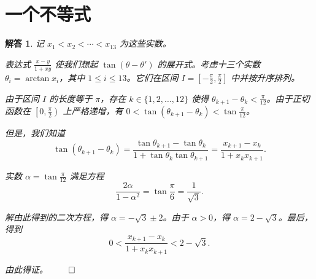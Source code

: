 \documentclass[12pt,UTF8]{ctexbook}
\theoremstyle{exercisestyle}
\theoremstyle{solutionstyle}
\newtheorem*{solution*}{解答}
\newenvironment{solution}
  {\begin{solution*}}
  {\hfill\ensuremath{\qed}\end{solution*}}
\begin{document}
\section{一个不等式}
\begin{solution}
  记 \(x_1 < x_2 < \cdots < x_{13}\) 为这些实数。

  表达式 \(\frac{x-y}{1+xy}\) 使我们想起 \(\tan(\theta - \theta')\) 的展开式。考虑十三个实数 \(\theta_i = \arctan x_i\)，其中 \(1 \leq i \leq 13\)。它们在区间 \(I = \left[-\frac{\pi}{2}, \frac{\pi}{2}\right]\) 中并按升序排列。

  由于区间 \(I\) 的长度等于 \(\pi\)，存在 \(k \in \{1, 2, \dots, 12\}\) 使得 \(\theta_{k+1} - \theta_k < \frac{\pi}{12}\)。由于正切函数在 \(\left[0, \frac{\pi}{2}\right)\) 上严格递增，有 \(0 < \tan(\theta_{k+1} - \theta_k) < \tan \frac{\pi}{12}\)。

  但是，我们知道
  \[
  \tan(\theta_{k+1} - \theta_k) = \frac{\tan \theta_{k+1} - \tan \theta_k}{1 + \tan \theta_k \tan \theta_{k+1}} = \frac{x_{k+1} - x_k}{1 + x_k x_{k+1}}.
  \]

  实数 \(\alpha = \tan \frac{\pi}{12}\) 满足方程
  \[
  \frac{2\alpha}{1-\alpha^2} = \tan\frac{\pi}{6} = \frac{1}{\sqrt{3}}.
  \]

  解由此得到的二次方程，得 \(\alpha = -\sqrt{3} \pm 2\)。由于 \(\alpha > 0\)，得 \(\alpha = 2 - \sqrt{3}\)。最后，得到
  \[
  0 < \frac{x_{k+1} - x_k}{1 + x_k x_{k+1}} < 2 - \sqrt{3}.
  \]

  由此得证。
\end{solution}
\end{document}
